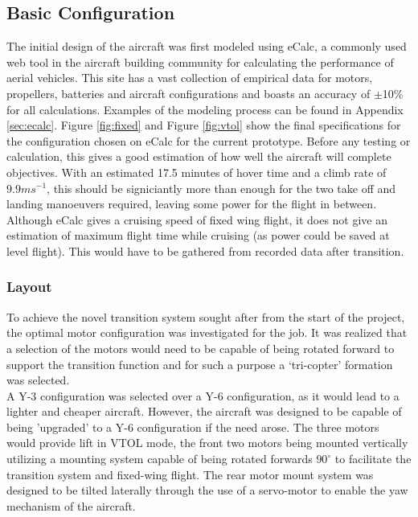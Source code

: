 \subsection{Basic Configuration}
The initial design of the aircraft was first modeled using eCalc\cite{ref:ecalc}, a commonly used web tool in the aircraft building community for calculating the performance of aerial vehicles. This site has a vast collection of empirical data for motors, propellers, batteries and aircraft configurations and boasts an accuracy of $\pm$10\% for all calculations. Examples of the modeling process can be found in Appendix \ref{sec:ecalc}. Figure \ref{fig:fixed} and Figure \ref{fig:vtol} show the final specifications for the configuration chosen on eCalc for the current prototype. Before any testing or calculation, this gives a good estimation of how well the aircraft will complete objectives. With an estimated 17.5 minutes of hover time and a climb rate of $9.9ms^{-1}$, this should be signiciantly more than enough for the two take off and landing manoeuvers required, leaving some power for the flight in between. Although eCalc gives a cruising speed of fixed wing flight, it does not give an estimation of maximum flight time while cruising (as power could be saved at level flight). This would have to be gathered from recorded data after transition.

\subsubsection*{Layout}
To achieve the novel transition system sought after from the start of the project, the optimal motor configuration was investigated for the job. It was realized that a selection of the motors would need to be capable of being rotated forward to support the transition function and for such a purpose a `tri-copter' formation was selected.\\
		
A Y-3 configuration was selected over a Y-6 configuration, as it would lead to a lighter and cheaper aircraft. However, the aircraft was designed to be capable of being 'upgraded' to a Y-6 configuration if the need arose. The three motors would provide lift in VTOL mode, the front two motors being mounted vertically utilizing a mounting system capable of being rotated forwards $90^{\circ}$ to facilitate the transition system and fixed-wing flight. The rear motor mount system was designed to be tilted laterally through the use of a servo-motor to enable the yaw mechanism of the aircraft.

